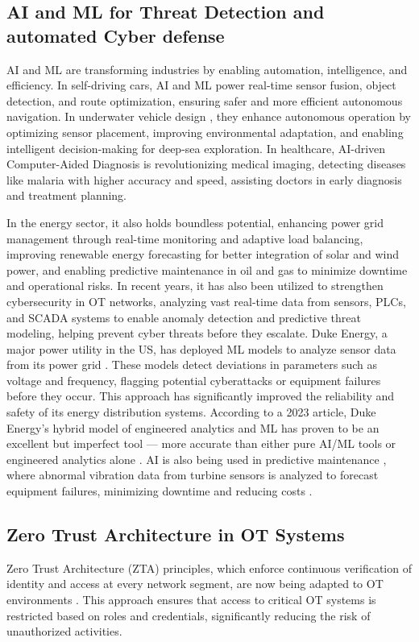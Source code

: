 \subsection {AI and ML for Threat Detection and automated Cyber defense} 
AI and ML are transforming industries by enabling automation, intelligence, and efficiency. In self-driving cars, AI and ML power real-time sensor fusion, object detection, and route optimization, ensuring safer and more efficient autonomous navigation. In underwater vehicle design \cite{vardhan2024sample}\cite{vardhan2024fusion} \cite{vardhan2022deep}, they enhance autonomous operation by optimizing sensor placement, improving environmental adaptation, and enabling intelligent decision-making for deep-sea exploration. In healthcare, AI-driven Computer-Aided Diagnosis is revolutionizing medical imaging, detecting diseases like malaria with higher accuracy \cite{kumar2023malaria} and speed, assisting doctors in early diagnosis and treatment planning.

In the energy sector, it also holds boundless potential, enhancing power grid management through real-time monitoring and adaptive load balancing, improving renewable energy forecasting for better integration of solar and wind power, and enabling predictive maintenance in oil and gas to minimize downtime and operational risks. In recent years, it has also been utilized to strengthen cybersecurity in OT networks, analyzing vast real-time data from sensors, PLCs, and SCADA systems to enable anomaly detection and predictive threat modeling, helping prevent cyber threats before they escalate. Duke Energy, a major power utility in the US, has deployed ML models to analyze sensor data from its power grid \cite{akeenhancing}. These models detect deviations in parameters such as voltage and frequency, flagging potential cyberattacks or equipment failures before they occur. This approach has significantly improved the reliability and safety of its energy distribution systems. According to a 2023 article, Duke Energy’s hybrid model of engineered analytics and ML has proven to be an excellent but imperfect tool — more accurate than either pure AI/ML tools or engineered analytics alone \cite{tdworld}. AI is also being used in predictive maintenance \cite{jambol2024transforming}, where abnormal vibration data from turbine sensors is analyzed to forecast equipment failures, minimizing downtime and reducing costs \cite{ahadov2024predictive}.

\subsection {Zero Trust Architecture in OT Systems} 
Zero Trust Architecture (ZTA) principles, which enforce continuous verification of identity and access at every network segment, are now being adapted to OT environments \cite{syed2022zero}. This approach ensures that access to critical OT systems is restricted based on roles and credentials, significantly reducing the risk of unauthorized activities.


